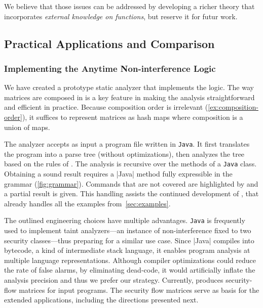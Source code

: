 We believe that those issues can be addressed by developing a richer theory that incorporates \emph{external knowledge on functions}, but reserve it for futur work.

\subsection{Practical Applications and Comparison}\label{sec:apps}

\subsubsection{Implementing the Anytime Non-interference Logic}\label{sec:analyzer}

We have created a prototype static analyzer \tool that implements the \lname logic.
The way matrices are composed in \lname is a key feature in making the analysis straightforward and efficient in practice.
Because composition order is irrelevant (\autoref{ex:composition-order}), it suffices to represent matrices as hash maps where composition is a union of maps.

The \tool analyzer accepts as input a program file written in \texttt{Java}.
It first translates the program into a parse tree (without optimizations), then analyzes the tree based on the rules of \lname.
The analysis is recursive over the methods of a \texttt{Java} class.
Obtaining a sound result requires a \prc|Java| method fully expressible in the \lname grammar (\autoref{fig:grammar}).
Commands that are not covered are highlighted by \tool and a partial result is given.
This handling assists the continued development of \lname, that already handles all the examples from~\autoref{sec:examples}.

The outlined engineering choices have multiple advantages.
\texttt{Java} is frequently used to implement taint analyzers---an instance of non-interference fixed to two security classes---thus preparing \tool for a similar use case.
Since \prc|Java| compiles into bytecode, a kind of intermediate stack language, it enables program analysis at multiple language representations.
Although compiler optimizations could reduce the rate of false alarms, \eg by eliminating dead-code,
it would artificially inflate the analysis precision and thus we prefer our strategy.
Currently, \tool produces security-flow matrices for input programs.
The security flow matrices serve as basis for the extended applications, including the directions presented next.


